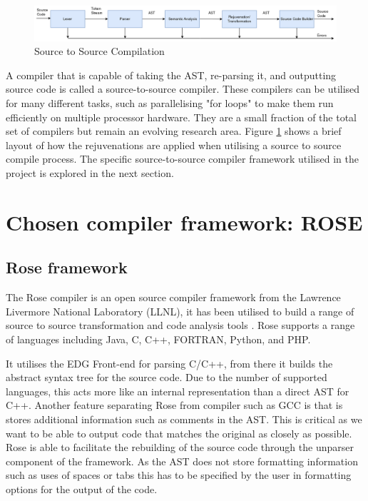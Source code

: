 \documentclass[bsc,frontabs,singlespacing,parskip,deptreport]{infthesis}
\begin{document}
\begin{figure}[!h]
    \centering
    \includegraphics[width=\textwidth]{images/Compilation-process-src.png}
    \caption{Source to Source Compilation}
    \label{fig:comp_proc_src}
\end{figure}

A compiler that is capable of taking the AST, re-parsing it, and outputting source code is called a source-to-source compiler. These compilers can be utilised for many different tasks, such as parallelising "for loops" to make them run efficiently on multiple processor hardware. They are a small fraction of the total set of compilers but remain an evolving research area. Figure \ref{fig:comp_proc_src} shows a brief layout of how the rejuvenations are applied when utilising a source to source compile process. The specific source-to-source compiler framework utilised in the project is explored in the next section.


\section{Chosen compiler framework: ROSE}
\subsection{Rose framework}
The Rose compiler \cite{ROSE} is an open source compiler framework from the Lawrence Livermore National Laboratory (LLNL), it has been utilised to build a range of source to source transformation and code analysis tools \cite{ROSE_TOOLS}. Rose supports a range of languages including Java, C, C++, FORTRAN, Python, and PHP. 

It utilises the EDG Front-end \cite{EDG} for parsing C/C++, from there it builds the abstract syntax tree for the source code. Due to the number of supported languages, this acts more like an internal representation than a direct AST for C++. Another feature separating Rose from compiler such as GCC is that is stores additional information such as comments in the AST. This is critical as we want to be able to output code that matches the original as closely as possible. Rose is able to facilitate the rebuilding of the source code through the unparser component of the framework. As the AST does not store formatting information such as uses of spaces or tabs this has to be specified by the user in formatting options for the output of the code.
\end{document}
